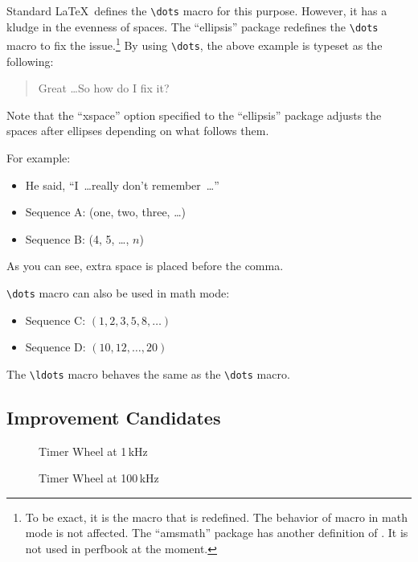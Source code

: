 Standard \LaTeX\ defines the \verb|\dots| macro for this purpose.
However, it has a kludge in the evenness of spaces.
The ``ellipsis'' package redefines the \verb|\dots| macro to fix
the issue.\footnote{To be exact, it is the \co{\\textellipsis} macro
  that is redefined. The behavior of \co{\\dots} macro in math
  mode is not affected. The ``amsmath'' package has another definition
  of \co{\\dots}. It is not used in perfbook at the moment.}
By using \verb|\dots|, the above example is typeset as the following:

\begin{quote}
  Great \dots So how do I fix it?
\end{quote}

Note that the ``xspace'' option specified to the ``ellipsis'' package
adjusts the spaces after ellipses depending on what follows them.

For example:

\begin{itemize}[itemsep=.2ex]
\item He said, ``I~\dots really don't remember~\dots''
\item Sequence A: (one, two, three, \dots)
\item Sequence B: (4, 5, \dots, $n$)
\end{itemize}

As you can see, extra space is placed before the comma.

\verb|\dots| macro can also be used in math mode:

\begin{itemize}[itemsep=.2ex]
\item Sequence C: $(1, 2, 3, 5, 8, \dots)$
\item Sequence D: $(10, 12, \dots, 20)$
\end{itemize}

The \verb|\ldots| macro behaves the same as the \verb|\dots| macro.

\subsection{Improvement Candidates}
\label{sec:app:styleguide:Improvement Candidates}

\begin{figure*}[tbh]\centering
\begin{minipage}[t][][t]{2.1in}
\caption{Timer Wheel at 1\,kHz}
\label{fig:app:styleguide:Timer Wheel at 1kHz}
\end{minipage}
\qquad
\begin{minipage}[t][][t]{2.3in}
\caption{Timer Wheel at 100\,kHz}
\label{fig:app:styleguide:Timer Wheel at 100kHz}
\end{minipage}
\end{figure*}

